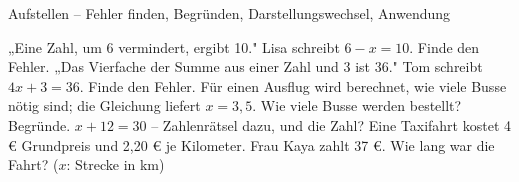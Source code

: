 \begin{aufgabe}{Aufstellen – Fehler finden, Begründen, Darstellungswechsel, Anwendung}
\begin{teile}
\teil „Eine Zahl, um 6 vermindert, ergibt 10." Lisa schreibt $6 - x = 10$. Finde den Fehler.
\teil „Das Vierfache der Summe aus einer Zahl und 3 ist 36." Tom schreibt $4x + 3 = 36$. Finde den Fehler.
\teil Für einen Ausflug wird berechnet, wie viele Busse nötig sind; die Gleichung liefert $x = 3{,}5$. Wie viele Busse werden bestellt? Begründe.
\teil $x + 12 = 30$ – Zahlenrätsel dazu, und die Zahl?
\teil Eine Taxifahrt kostet 4 € Grundpreis und 2,20 € je Kilometer. Frau Kaya zahlt 37 €. Wie lang war die Fahrt? ($x$: Strecke in km) \leerfeld[km]
\end{teile}
\end{aufgabe}
